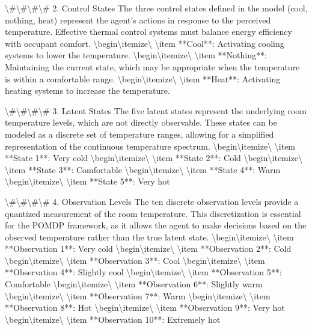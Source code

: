 \documentclass[11pt,a4paper]{article}
\begin{document}
\textbackslash{}#\textbackslash{}#\textbackslash{}#\textbackslash{}# 2. Control States
The three control states defined in the model (cool, nothing, heat) represent the agent's actions in response to the perceived temperature. Effective thermal control systems must balance energy efficiency with occupant comfort.
\textbackslash{}begin\textbackslash{}{itemize\textbackslash{}}
\textbackslash{}item **Cool**: Activating cooling systems to lower the temperature.
\textbackslash{}begin\textbackslash{}{itemize\textbackslash{}}
\textbackslash{}item **Nothing**: Maintaining the current state, which may be appropriate when the temperature is within a comfortable range.
\textbackslash{}begin\textbackslash{}{itemize\textbackslash{}}
\textbackslash{}item **Heat**: Activating heating systems to increase the temperature.

\textbackslash{}#\textbackslash{}#\textbackslash{}#\textbackslash{}# 3. Latent States
The five latent states represent the underlying room temperature levels, which are not directly observable. These states can be modeled as a discrete set of temperature ranges, allowing for a simplified representation of the continuous temperature spectrum.
\textbackslash{}begin\textbackslash{}{itemize\textbackslash{}}
\textbackslash{}item **State 1**: Very cold
\textbackslash{}begin\textbackslash{}{itemize\textbackslash{}}
\textbackslash{}item **State 2**: Cold
\textbackslash{}begin\textbackslash{}{itemize\textbackslash{}}
\textbackslash{}item **State 3**: Comfortable
\textbackslash{}begin\textbackslash{}{itemize\textbackslash{}}
\textbackslash{}item **State 4**: Warm
\textbackslash{}begin\textbackslash{}{itemize\textbackslash{}}
\textbackslash{}item **State 5**: Very hot

\textbackslash{}#\textbackslash{}#\textbackslash{}#\textbackslash{}# 4. Observation Levels
The ten discrete observation levels provide a quantized measurement of the room temperature. This discretization is essential for the POMDP framework, as it allows the agent to make decisions based on the observed temperature rather than the true latent state.
\textbackslash{}begin\textbackslash{}{itemize\textbackslash{}}
\textbackslash{}item **Observation 1**: Very cold
\textbackslash{}begin\textbackslash{}{itemize\textbackslash{}}
\textbackslash{}item **Observation 2**: Cold
\textbackslash{}begin\textbackslash{}{itemize\textbackslash{}}
\textbackslash{}item **Observation 3**: Cool
\textbackslash{}begin\textbackslash{}{itemize\textbackslash{}}
\textbackslash{}item **Observation 4**: Slightly cool
\textbackslash{}begin\textbackslash{}{itemize\textbackslash{}}
\textbackslash{}item **Observation 5**: Comfortable
\textbackslash{}begin\textbackslash{}{itemize\textbackslash{}}
\textbackslash{}item **Observation 6**: Slightly warm
\textbackslash{}begin\textbackslash{}{itemize\textbackslash{}}
\textbackslash{}item **Observation 7**: Warm
\textbackslash{}begin\textbackslash{}{itemize\textbackslash{}}
\textbackslash{}item **Observation 8**: Hot
\textbackslash{}begin\textbackslash{}{itemize\textbackslash{}}
\textbackslash{}item **Observation 9**: Very hot
\textbackslash{}begin\textbackslash{}{itemize\textbackslash{}}
\textbackslash{}item **Observation 10**: Extremely hot
\end{document}

